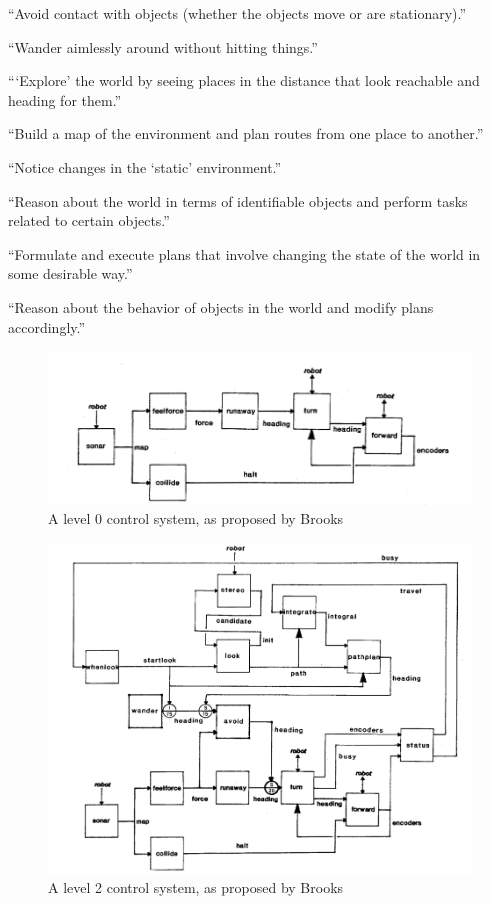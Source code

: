 \documentclass[a4paper,10pt]{article}
\begin{document}
\begin{enumerate*}
\setcounter{enumi}{-1}
\item ``Avoid contact with objects (whether the objects move or
are stationary).''
\item ``Wander aimlessly around without hitting things.''
\item ```Explore' the world by seeing places in the distance
that look reachable and heading for them.''
\item ``Build a map of the environment and plan routes from one
place to another.''
\item ``Notice changes in the `static' environment.''
\item ``Reason about the world in terms of identifiable objects
and perform tasks related to certain objects.''
\item ``Formulate and execute plans that involve changing the
state of the world in some desirable way.''
\item ``Reason about the behavior of objects in the world and
modify plans accordingly.''
\end{enumerate*}

\begin{figure}
    \centering
    \includegraphics[width=.8\textwidth]{images/level0.png}
    \caption{A level 0 control system, as proposed by Brooks}
    \label{fig:levelzero}
\end{figure}
\begin{figure}
    \centering
    \includegraphics[width=.8\textwidth]{images/level2.png}
    \caption{A level 2 control system, as proposed by Brooks}
    \label{fig:leveltwo}
\end{figure}
\end{document}
